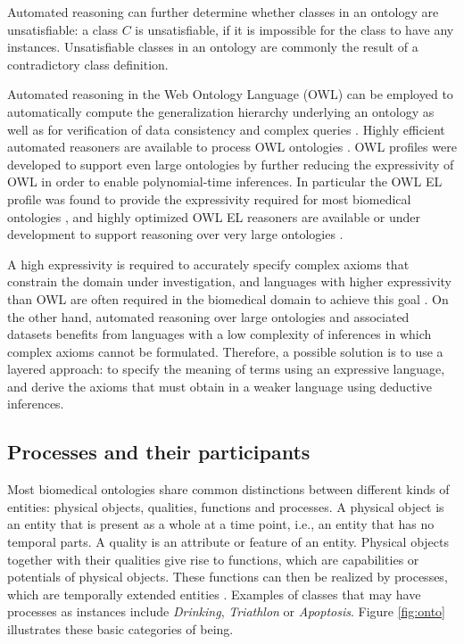 \documentclass[12pt]{article}
\renewcommand{\cite}{\citep}
\begin{document}
Automated reasoning can further determine whether classes in an
ontology are unsatisfiable: a class $C$ is unsatisfiable, if it is
impossible for the class to have any instances. Unsatisfiable classes
in an ontology are commonly the result of a contradictory class
definition. %

Automated reasoning in the Web Ontology Language (OWL) can be employed
to automatically compute the generalization hierarchy underlying an
ontology as well as for verification of data consistency and complex
queries \cite{Hoehndorf2011incon, Hoehndorf2011models}. Highly
efficient automated reasoners are available to process OWL ontologies
\cite{Sirin2004, Tsarkov2006, Motik2009a}. OWL profiles were developed
to support even large ontologies by further reducing the expressivity
of OWL in order to enable polynomial-time inferences. In particular
the OWL EL profile was found to provide the expressivity required for
most biomedical ontologies \cite{el4, elvira}, and highly optimized
OWL EL reasoners are available or under development to support
reasoning over very large ontologies \cite{el4, cbreasoner}.

A high expressivity is required to accurately specify complex axioms
that constrain the domain under investigation, and languages with
higher expressivity than OWL are often required in the biomedical
domain to achieve this goal \cite{Hoehndorf2009sequences, rnao}. On
the other hand, automated reasoning over large ontologies and
associated datasets benefits from languages with a low complexity of
inferences in which complex axioms cannot be formulated. Therefore, a
possible solution is to use a layered approach: to specify the meaning
of terms using an expressive language, and derive the axioms that
must obtain in a weaker language using deductive inferences.

\subsection{Processes and their participants}
Most biomedical ontologies share common distinctions between different
kinds of entities: physical objects, qualities, functions and
processes. A physical object is an entity that is present as a whole
at a time point, i.e., an entity that has no temporal parts. A quality
is an attribute or feature of an entity. Physical objects together
with their qualities give rise to functions, which are capabilities or
potentials of physical objects. These functions can then be realized
by processes, which are temporally extended entities
\cite{Burek2006}. Examples of classes that may have processes as
instances include {\em Drinking}, {\em Triathlon} or {\em Apoptosis}.
Figure \ref{fig:onto} illustrates these basic categories of being.
\end{document}
